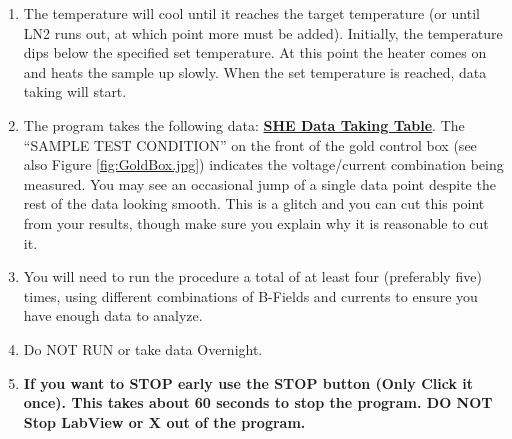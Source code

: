 \documentclass{../lab}
\begin{document}
\begin{enumerate}
    \item The temperature will cool until it reaches the target temperature (or until LN2 runs out, at which point more must be added). Initially, the temperature dips below the specified set temperature. At this point the heater comes on and heats the sample up slowly. When the set temperature is reached, data taking will start.

    \item The program takes the following data: \href{https://berkeley-physics111b.github.io/assets/pdf/oldwebsitestructure/images/SHE_Data_Taking_Table.pdf}{\textbf{SHE Data Taking Table}}. The ``SAMPLE TEST CONDITION'' on the front of the gold control box (see also Figure \ref{fig:GoldBox.jpg}) indicates the voltage/current combination being measured. You may see an occasional jump of a single data point despite the rest of the data looking smooth. This is a glitch and you can cut this point from your results, though make sure you explain why it is reasonable to cut it.
    
    
    \item You will need to run the procedure a total of at least four (preferably five) times, using different combinations of B-Fields and currents to ensure you have enough data to analyze.

    \item Do NOT RUN or take data Overnight.

    \item \textbf{If you want to STOP early use the STOP button (Only Click it once). This takes about 60 seconds to stop the program. DO NOT Stop LabView or X out of the program.}

    \end{enumerate}

\end{document}
